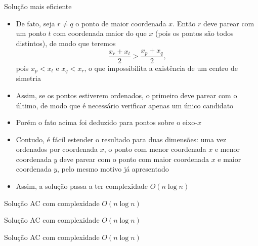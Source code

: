 \begin{frame}[fragile]{Solução mais eficiente}

    \begin{itemize}
        \item De fato, seja $r \neq q$ o ponto de maior coordenada $x$. Então $r$ deve parear
            com um ponto $t$ com coordenada maior do que $x$ (pois os pontos são todos
            distintos), de modo que teremos
        \[
            \frac{x_r + x_t}{2} > \frac{x_p + x_q}{2},
        \]
        pois $x_p < x_t$ e $x_q < x_r$, o que impossibilita a existência de um centro de simetria

        \item Assim, se os pontos estiverem ordenados, o primeiro deve parear com o último, de modo
            que é necessário verificar apenas um único candidato

        \item Porém o fato acima foi deduzido para pontos sobre o eixo-$x$

        \item Contudo, é fácil estender o resultado para duas dimensões: uma vez ordenados por
            coordenada $x$, o ponto com menor coordenada $x$ e menor coordenada $y$ deve parear
            com o ponto com maior coordenada $x$ e maior coordenada $y$, pelo mesmo motivo
            já apresentado

        \item Assim, a solução passa a ter complexidade $O(n\log  n)$
    \end{itemize}

\end{frame}

\begin{frame}[fragile]{Solução AC com complexidade $O(n\log n)$}
\end{frame}

\begin{frame}[fragile]{Solução AC com complexidade $O(n\log n)$}
\end{frame}

\begin{frame}[fragile]{Solução AC com complexidade $O(n\log n)$}
\end{frame}






